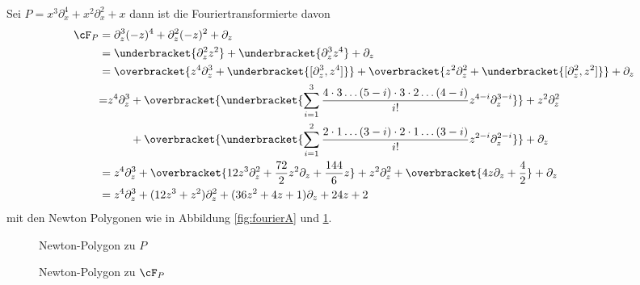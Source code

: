 \begin{exmp}
Sei $P=x^3\partial_x^4+x^2\partial_x^2+x$ dann ist die Fouriertransformierte
davon
\begin{align*}
\cF_P&=\partial_z^3(-z)^4+\partial_z^2(-z)^2+\partial_z
\\&=\underbracket{\partial_z^2z^2} + \underbracket{\partial_z^3z^4}+\partial_z
\\&=\overbracket{z^4\partial_z^3 + \underbracket{[\partial_z^3,z^4]}}
  + \overbracket{z^2\partial_z^2 + \underbracket{[\partial_z^2,z^2]}}
  + \partial_z
\\&\begin{aligned}
  =&z^4\partial_z^3 + \overbracket{\underbracket{
    \sum_{i=1}^3\frac{4\cdot3\dots(5-i)\cdot 3 \cdot 2  \dots
    (4-i)}{i!}z^{4-i}\partial_z^{3-i}
  }} + z^2\partial_z^2
\\&\qquad+ \overbracket{\underbracket{
    \sum_{i=1}^2\frac{2\cdot1\dots(3-i)\cdot 2 \cdot 1  \dots
    (3-i)}{i!}z^{2-i}\partial_z^{2-i}
  }}
  + \partial_z
\end{aligned}
\\&=z^4\partial_z^3 + \overbracket{
    12z^3\partial_z^2 + \frac{72}{2}z^2\partial_z + \frac{144}{6}z
  }
  + z^2\partial_z^2 + \overbracket{ 4z\partial_z + \frac{4}{2} } + \partial_z
\\&=z^4\partial_z^3
  + (12z^3 + z^2)\partial_z^2
  + (36z^2 + 4z + 1)\partial_z
  + 24z + 2
\end{align*}
mit den Newton Polygonen wie in Abbildung \ref{fig:fourierA} und
\ref{fig:fourierB}.
\begin{figure}[htbp]
  \begin{minipage}[hbt]{0,49\textwidth}
  \begin{center}
  \end{center}
  \caption{Newton-Polygon zu $P$}
    \label{fig:fourierA}
  \end{minipage}
  \begin{minipage}[hbt]{0,49\textwidth}
  \begin{center}
  \end{center}
  \caption{Newton-Polygon zu $\cF_P$}
    \label{fig:fourierB}
  \end{minipage}
\end{figure}
\end{exmp}

\begin{comment}
\subsection{Betrachten bei Unendlich}
\end{comment}
